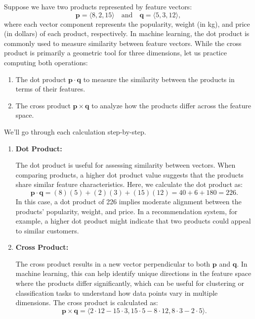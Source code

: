 \exampleline
\begin{example}
Suppose we have two products represented by feature vectors:
\[
\mathbf{p} = \langle 8, 2, 15 \rangle \quad \text{and} \quad \mathbf{q} = \langle 5, 3, 12 \rangle,
\]
where each vector component represents the popularity, weight (in kg), and price (in dollars) of each product, respectively. In machine learning, the dot product is commonly used to measure similarity between feature vectors. While the cross product is primarily a geometric tool for three dimensions, let us practice computing both operations:
\begin{enumerate}
    \item The dot product \( \mathbf{p} \cdot \mathbf{q} \) to measure the similarity between the products in terms of their features.
    \item The cross product \( \mathbf{p} \times \mathbf{q} \) to analyze how the products differ across the feature space.
\end{enumerate}

\begin{solution}
We’ll go through each calculation step-by-step.

\begin{enumerate}
    \item \textbf{Dot Product:}

    \noindent The dot product is useful for assessing similarity between vectors. When comparing products, a higher dot product value suggests that the products share similar feature characteristics. Here, we calculate the dot product as:
    \[
    \mathbf{p} \cdot \mathbf{q} = (8)(5) + (2)(3) + (15)(12) = 40 + 6 + 180 = 226.
    \]
    In this case, a dot product of 226 implies moderate alignment between the products' popularity, weight, and price. In a recommendation system, for example, a higher dot product might indicate that two products could appeal to similar customers.

    \item \textbf{Cross Product:}

    \noindent The cross product results in a new vector perpendicular to both \( \mathbf{p} \) and \( \mathbf{q} \). In machine learning, this can help identify unique directions in the feature space where the products differ significantly, which can be useful for clustering or classification tasks to understand how data points vary in multiple dimensions. The cross product is calculated as:
    \[
    \mathbf{p} \times \mathbf{q} = \langle 2 \cdot 12 - 15 \cdot 3, 15 \cdot 5 - 8 \cdot 12, 8 \cdot 3 - 2 \cdot 5 \rangle.
    \]


\end{enumerate}
\end{solution}
\end{example}
